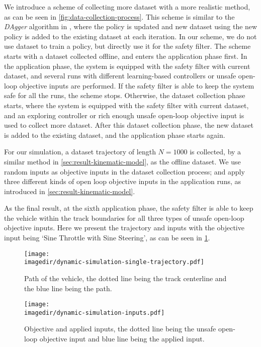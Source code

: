 We introduce a scheme of collecting more dataset with a more realistic method, as can be seen in \cref{fig:data-collection-process}.
This scheme is similar to the \emph{DAgger} algorithm in \cite{rossReductionImitationLearning2011}, where the policy is updated and new dataset using the new policy is added to the existing dataset at each iteration.
In our scheme, we do not use dataset to train a policy, but directly use it for the safety filter.
The scheme starts with a dataset collected offline, and enters the application phase first.
In the application phase, the system is equipped with the safety filter with current dataset, and several runs with different learning-based controllers or unsafe open-loop objective inputs are performed.
If the safety filter is able to keep the system safe for all the runs, the scheme stops.
Otherwise, the dataset collection phase starts, where the system is equipped with the safety filter with current dataset, and an exploring controller or rich enough unsafe open-loop objective input is used to collect more dataset.
After this dataset collection phase, the new dataset is added to the existing dataset, and the application phase starts again.


For our simulation, a dataset trajectory of length $N=1000$ is collected, by a similar method in \cref{sec:result-kinematic-model}, as the offline dataset.
We use random inputs as objective inputs in the dataset collection process; and apply three different kinds of open loop objective inputs in the application runs, as introduced in \cref{sec:result-kinematic-model}.

As the final result, at the sixth application phase, the safety filter is able to keep the vehicle within the track boundaries for all three types of unsafe open-loop objective inputs.
Here we present the trajectory and inputs with the objective input being `Sine Throttle with Sine Steering', as can be seen in \cref{fig:dynamic-single-run}.

\begin{figure}[ht]
    \centering
    \texttt{[image: \\imagedir/dynamic-simulation-single-trajectory.pdf]}
    \caption{Path of the vehicle, the dotted line being the track centerline and the blue line being the path.}
    \texttt{[image: \\imagedir/dynamic-simulation-inputs.pdf]}
    \caption{Objective and applied inputs, the dotted line being the unsafe open-loop objective input and blue line being the applied input.}
    \label{fig:dynamic-single-run}
\end{figure}

